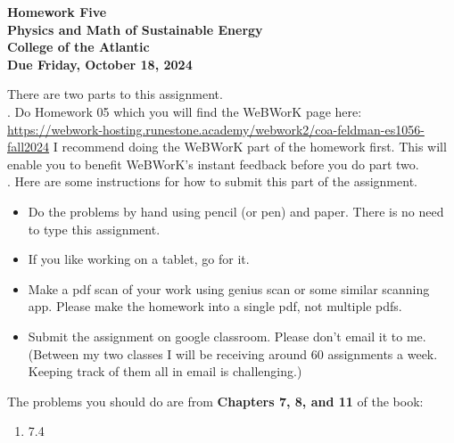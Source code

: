 \documentclass[12pt]{article}
\begin{document}
\pagestyle{empty}
 
\begin{center}
{\LARGE {\bf Homework Five}}\\
\bigskip
{\Large {\bf Physics and Math of Sustainable Energy}}\\
\bigskip
{\Large {\bf College of the Atlantic}}\\
\bigskip
{ {\bf Due Friday, October 18, 2024}}\\ 
\end{center}
\medskip


\noindent There are two parts to this assignment.\\

.  Do Homework 05 which you
will find the WeBWorK page here:
\url{https://webwork-hosting.runestone.academy/webwork2/coa-feldman-es1056-fall2024}
I recommend doing the WeBWorK part of the homework first.  This will
enable you to benefit WeBWorK's instant feedback before you do part
two.\\ 


.  Here are some
instructions for how to submit this part of the assignment.
\begin{itemize}
\item Do the problems by hand using pencil (or pen) and paper.
  There is no need to type this assignment.
\item If you like working on a tablet, go for it. 
\item Make a pdf scan of your work using genius scan or some
  similar scanning app.  Please make the homework into a single
  pdf, not multiple pdfs.
\item Submit the assignment on google classroom.  Please don't
  email it to me.  (Between my two classes I will be receiving
  around 60 assignments a week.  Keeping track of them all in email 
  is challenging.)\\
\end{itemize}



\noindent The problems you should do are from {\bf Chapters 7, 8, and
  11} of the book:  \\ 

\begin{enumerate}
\setlength{\itemsep}{-1mm}
  \item 7.4\\ 
\end{enumerate}
\end{document}
